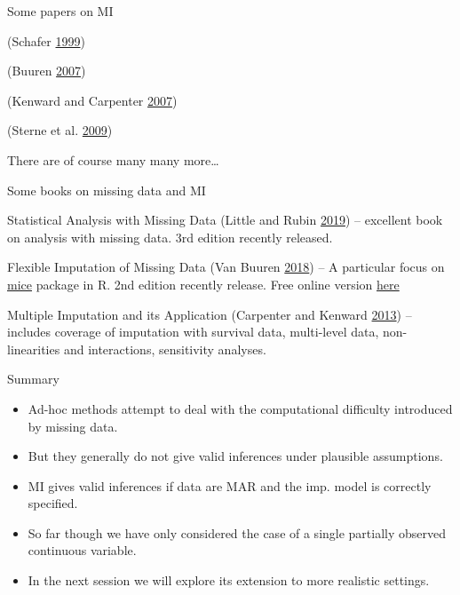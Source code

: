 \documentclass[ignorenonframetext,]{beamer}
\providecommand{\tightlist}{%
  \setlength{\itemsep}{0pt}\setlength{\parskip}{0pt}}
\begin{document}
\begin{frame}{Some papers on MI}
\protect\hypertarget{some-papers-on-mi}{}

(Schafer \protect\hyperlink{ref-Schafer:1999}{1999})

(Buuren \protect\hyperlink{ref-Buuren:2007}{2007})

(Kenward and Carpenter
\protect\hyperlink{ref-Kenwardux2fCarpenter:2007}{2007})

(Sterne et al.
\protect\hyperlink{ref-Sterneux2fWhiteux2fCarlin:2009}{2009})

There are of course many many more\ldots{}

\end{frame}

\begin{frame}{Some books on missing data and MI}
\protect\hypertarget{some-books-on-missing-data-and-mi}{}

Statistical Analysis with Missing Data (Little and Rubin
\protect\hyperlink{ref-little2019statistical}{2019}) -- excellent book
on analysis with missing data. 3rd edition recently released.

Flexible Imputation of Missing Data (Van Buuren
\protect\hyperlink{ref-van2018flexible}{2018}) -- A particular focus on
\href{https://cran.r-project.org/web/packages/mice/index.html}{mice}
package in R. 2nd edition recently release. Free online version
\href{https://stefvanbuuren.name/fimd/}{here}

Multiple Imputation and its Application (Carpenter and Kenward
\protect\hyperlink{ref-CarpenterKenward2013}{2013}) -- includes coverage
of imputation with survival data, multi-level data, non-linearities and
interactions, sensitivity analyses.

\end{frame}

\begin{frame}{Summary}
\protect\hypertarget{summary}{}

\begin{itemize}
\tightlist
\item
  Ad-hoc methods attempt to deal with the computational difficulty
  introduced by missing data.
\item
  But they generally do not give valid inferences under plausible
  assumptions.
\item
  MI gives valid inferences if data are MAR and the imp. model is
  correctly specified.
\item
  So far though we have only considered the case of a single partially
  observed continuous variable.
\item
  In the next session we will explore its extension to more realistic
  settings.
\end{itemize}

\end{frame}
\end{document}
